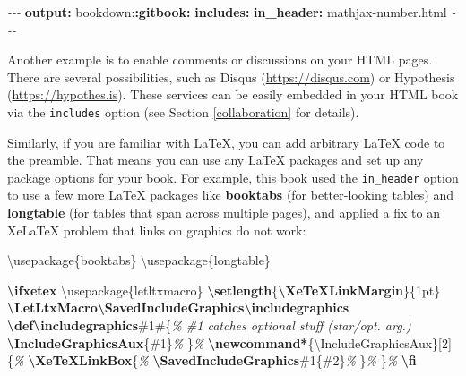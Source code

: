 \documentclass[
  12pt,
]{krantz}
\newenvironment{Shaded}{\begin{snugshade}}{\end{snugshade}}
\newcommand{\AttributeTok}[1]{\textcolor[rgb]{0.13,0.29,0.53}{#1}}
\newcommand{\BuiltInTok}[1]{#1}
\newcommand{\CommentTok}[1]{\textcolor[rgb]{0.56,0.35,0.01}{\textit{#1}}}
\newcommand{\ExtensionTok}[1]{#1}
\newcommand{\FunctionTok}[1]{\textcolor[rgb]{0.13,0.29,0.53}{\textbf{#1}}}
\newcommand{\KeywordTok}[1]{\textcolor[rgb]{0.13,0.29,0.53}{\textbf{#1}}}
\newcommand{\NormalTok}[1]{#1}
\newcommand{\PreprocessorTok}[1]{\textcolor[rgb]{0.56,0.35,0.01}{\textit{#1}}}
\theoremstyle{definition}
\theoremstyle{definition}
\theoremstyle{definition}
\theoremstyle{definition}
\theoremstyle{remark}
\begin{document}
\begin{Shaded}
\begin{Highlighting}[]
\PreprocessorTok{{-}{-}{-}}
\FunctionTok{output}\KeywordTok{:}
\AttributeTok{  bookdown:}\FunctionTok{:gitbook}\KeywordTok{:}
\AttributeTok{    }\FunctionTok{includes}\KeywordTok{:}
\AttributeTok{      }\FunctionTok{in\_header}\KeywordTok{:}\AttributeTok{ mathjax{-}number.html}
\PreprocessorTok{{-}{-}{-}}
\end{Highlighting}
\end{Shaded}

Another example is to enable comments or discussions on your HTML pages. There are several possibilities, such as Disqus (\url{https://disqus.com}) or Hypothesis (\url{https://hypothes.is}). These services can be easily embedded in your HTML book via the \texttt{includes} option (see Section \ref{collaboration} for details).

Similarly, if you are familiar with LaTeX, you can add arbitrary LaTeX code to the preamble. That means you can use any LaTeX packages and set up any package options for your book. For example, this book used the \texttt{in\_header} option to use a few more LaTeX packages like \textbf{booktabs} (for better-looking tables) and \textbf{longtable} (for tables that span across multiple pages), and applied a fix to an XeLaTeX problem that links on graphics do not work:

\begin{Shaded}
\begin{Highlighting}[]
\BuiltInTok{\textbackslash{}usepackage}\NormalTok{\{}\ExtensionTok{booktabs}\NormalTok{\}}
\BuiltInTok{\textbackslash{}usepackage}\NormalTok{\{}\ExtensionTok{longtable}\NormalTok{\}}

\FunctionTok{\textbackslash{}ifxetex}
  \BuiltInTok{\textbackslash{}usepackage}\NormalTok{\{}\ExtensionTok{letltxmacro}\NormalTok{\}}
  \FunctionTok{\textbackslash{}setlength}\NormalTok{\{}\FunctionTok{\textbackslash{}XeTeXLinkMargin}\NormalTok{\}\{1pt\}}
  \FunctionTok{\textbackslash{}LetLtxMacro\textbackslash{}SavedIncludeGraphics\textbackslash{}includegraphics}
  \FunctionTok{\textbackslash{}def\textbackslash{}includegraphics}\NormalTok{\#1\#\{}\CommentTok{\% \#1 catches optional stuff (star/opt. arg.)}
    \FunctionTok{\textbackslash{}IncludeGraphicsAux}\NormalTok{\{\#1\}}\CommentTok{\%}
\NormalTok{  \}}\CommentTok{\%}
  \FunctionTok{\textbackslash{}newcommand*}\NormalTok{\{}\ExtensionTok{\textbackslash{}IncludeGraphicsAux}\NormalTok{\}[2]\{}\CommentTok{\%}
    \FunctionTok{\textbackslash{}XeTeXLinkBox}\NormalTok{\{}\CommentTok{\%}
      \FunctionTok{\textbackslash{}SavedIncludeGraphics}\NormalTok{\#1\{\#2\}}\CommentTok{\%}
\NormalTok{    \}}\CommentTok{\%}
\NormalTok{  \}}\CommentTok{\%}
\FunctionTok{\textbackslash{}fi}
\end{Highlighting}
\end{Shaded}
\end{document}
